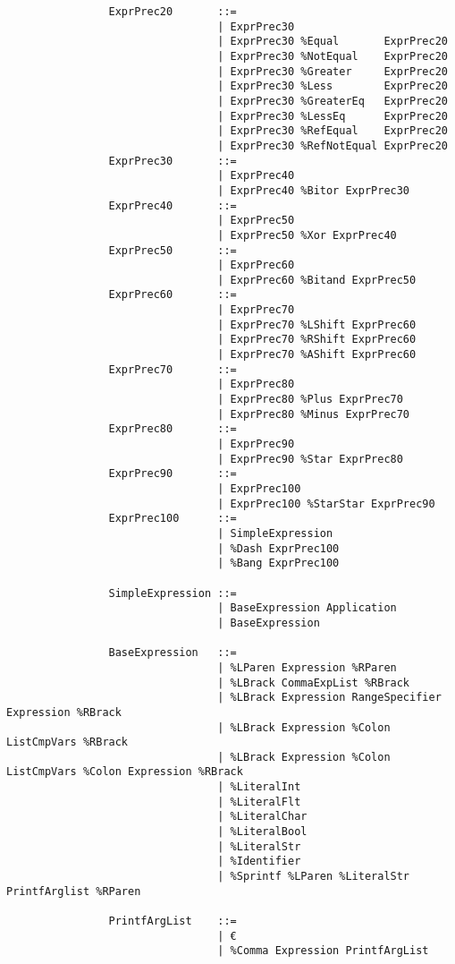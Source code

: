 \documentclass{article}
\begin{document}
\begin{verbatim}
				ExprPrec20       ::= 
				                 | ExprPrec30
				                 | ExprPrec30 %Equal       ExprPrec20
				                 | ExprPrec30 %NotEqual    ExprPrec20
				                 | ExprPrec30 %Greater     ExprPrec20
				                 | ExprPrec30 %Less        ExprPrec20
				                 | ExprPrec30 %GreaterEq   ExprPrec20
				                 | ExprPrec30 %LessEq      ExprPrec20
				                 | ExprPrec30 %RefEqual    ExprPrec20
				                 | ExprPrec30 %RefNotEqual ExprPrec20
				ExprPrec30       ::=
				                 | ExprPrec40
				                 | ExprPrec40 %Bitor ExprPrec30
				ExprPrec40       ::=
				                 | ExprPrec50
				                 | ExprPrec50 %Xor ExprPrec40
				ExprPrec50       ::=
				                 | ExprPrec60
				                 | ExprPrec60 %Bitand ExprPrec50
				ExprPrec60       ::=
				                 | ExprPrec70
				                 | ExprPrec70 %LShift ExprPrec60
				                 | ExprPrec70 %RShift ExprPrec60
				                 | ExprPrec70 %AShift ExprPrec60
				ExprPrec70       ::=
				                 | ExprPrec80
				                 | ExprPrec80 %Plus ExprPrec70
				                 | ExprPrec80 %Minus ExprPrec70
				ExprPrec80       ::=
				                 | ExprPrec90
				                 | ExprPrec90 %Star ExprPrec80
				ExprPrec90       ::=
				                 | ExprPrec100
				                 | ExprPrec100 %StarStar ExprPrec90
				ExprPrec100      ::=
				                 | SimpleExpression
				                 | %Dash ExprPrec100
				                 | %Bang ExprPrec100
				                 
				SimpleExpression ::=
				                 | BaseExpression Application
				                 | BaseExpression
				
				BaseExpression   ::=
				                 | %LParen Expression %RParen
				                 | %LBrack CommaExpList %RBrack
				                 | %LBrack Expression RangeSpecifier Expression %RBrack
				                 | %LBrack Expression %Colon ListCmpVars %RBrack
				                 | %LBrack Expression %Colon ListCmpVars %Colon Expression %RBrack
				                 | %LiteralInt
				                 | %LiteralFlt
				                 | %LiteralChar
				                 | %LiteralBool
				                 | %LiteralStr
				                 | %Identifier
				                 | %Sprintf %LParen %LiteralStr PrintfArglist %RParen
				                 
				PrintfArgList    ::=
				                 | €
				                 | %Comma Expression PrintfArgList
				                 

\end{verbatim}
\end{document}
